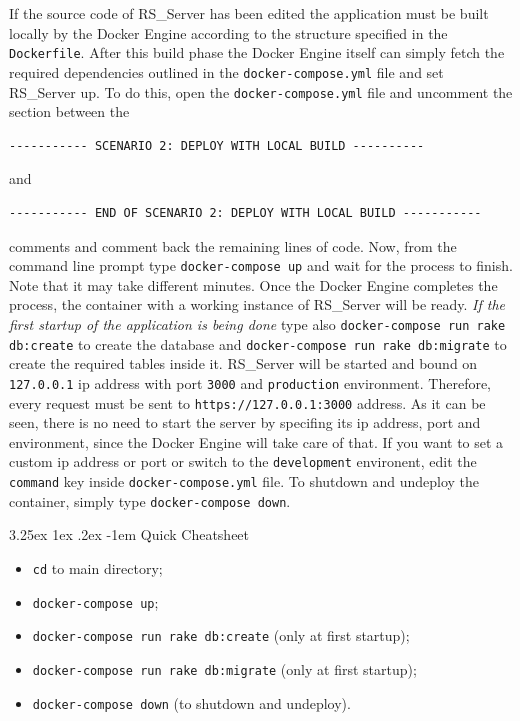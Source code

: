 \documentclass[a4paper, english]{article}
\makeatletter
\renewcommand\paragraph{\@startsection{paragraph}{5}{\z@}%
  {3.25ex \@plus1ex \@minus.2ex}%
  {-1em}%
  {\normalfont\normalsize\bfseries}}
\makeatother
\begin{document}
If the source code of RS\_Server has been edited the application must be built locally by the Docker Engine according to the structure specified in the \verb|Dockerfile|. After this build phase the Docker Engine itself can simply fetch the required dependencies outlined in the \verb|docker-compose.yml| file and set RS\_Server up. To do this, open the \verb|docker-compose.yml| file and uncomment the section between the 
\begin{verbatim}
----------- SCENARIO 2: DEPLOY WITH LOCAL BUILD ----------
\end{verbatim}
and 
\begin{verbatim}
----------- END OF SCENARIO 2: DEPLOY WITH LOCAL BUILD -----------
\end{verbatim} 
comments and comment back the remaining lines of code. Now, from the command line prompt type \verb|docker-compose up| and wait for the process to finish. Note that it may take different minutes. Once the Docker Engine completes the process, the container with a working instance of RS\_Server will be ready. \emph{If the first startup of the application is being done} type also \verb|docker-compose run rake db:create| to create the database and \verb|docker-compose run rake db:migrate| to create the required tables inside it. RS\_Server will be started and bound on \verb|127.0.0.1| ip address with port \verb|3000| and \verb|production| environment. Therefore, every request must be sent to \verb|https://127.0.0.1:3000| address. As it can be seen, there is no need to start the server by specifing its ip address, port and environment, since the Docker Engine will take care of that. If you want to set a custom ip address or port or switch to the \verb|development| environent, edit the \verb|command| key inside \verb|docker-compose.yml| file. To shutdown and undeploy the container, simply type \verb|docker-compose down|.

\paragraph{Quick Cheatsheet}

\begin{itemize}
\item \verb|cd| to main directory;
\item \verb|docker-compose up|;
\item \verb|docker-compose run rake db:create| (only at first startup);
\item \verb|docker-compose run rake db:migrate| (only at first startup);
\item \verb|docker-compose down| (to shutdown and undeploy).
\end{itemize}
\end{document}
